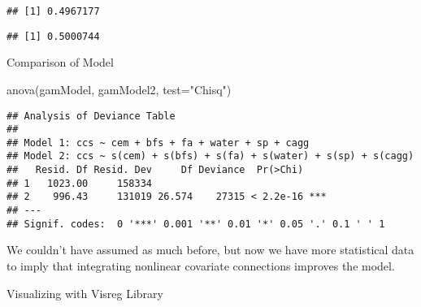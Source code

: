 \documentclass[
]{article}
\newenvironment{Shaded}{\begin{snugshade}}{\end{snugshade}}
\newcommand{\AttributeTok}[1]{\textcolor[rgb]{0.77,0.63,0.00}{#1}}
\newcommand{\DecValTok}[1]{\textcolor[rgb]{0.00,0.00,0.81}{#1}}
\newcommand{\FunctionTok}[1]{\textcolor[rgb]{0.00,0.00,0.00}{#1}}
\newcommand{\NormalTok}[1]{#1}
\newcommand{\OtherTok}[1]{\textcolor[rgb]{0.56,0.35,0.01}{#1}}
\newcommand{\SpecialCharTok}[1]{\textcolor[rgb]{0.00,0.00,0.00}{#1}}
\newcommand{\StringTok}[1]{\textcolor[rgb]{0.31,0.60,0.02}{#1}}
\begin{document}
\begin{verbatim}
## [1] 0.4967177
\end{verbatim}

\begin{Shaded}
\end{Shaded}

\begin{verbatim}
## [1] 0.5000744
\end{verbatim}

Comparison of Model

\begin{Shaded}
\begin{Highlighting}[]
\FunctionTok{anova}\NormalTok{(gamModel, gamModel2, }\AttributeTok{test=}\StringTok{"Chisq"}\NormalTok{)}
\end{Highlighting}
\end{Shaded}

\begin{verbatim}
## Analysis of Deviance Table
## 
## Model 1: ccs ~ cem + bfs + fa + water + sp + cagg
## Model 2: ccs ~ s(cem) + s(bfs) + s(fa) + s(water) + s(sp) + s(cagg)
##   Resid. Df Resid. Dev     Df Deviance  Pr(>Chi)    
## 1   1023.00     158334                              
## 2    996.43     131019 26.574    27315 < 2.2e-16 ***
## ---
## Signif. codes:  0 '***' 0.001 '**' 0.01 '*' 0.05 '.' 0.1 ' ' 1
\end{verbatim}

We couldn't have assumed as much before, but now we have more
statistical data to imply that integrating nonlinear covariate
connections improves the model.

Visualizing with Visreg Library
\end{document}
